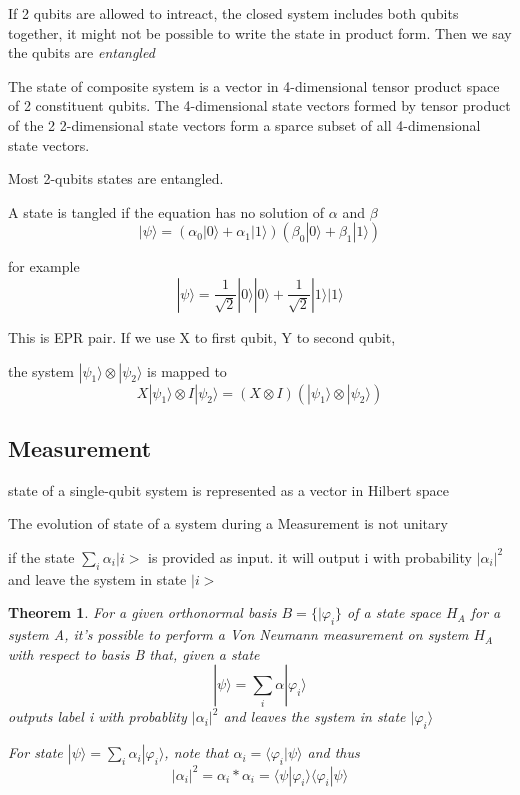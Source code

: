 \documentclass[10pt]{article}
\theoremstyle{break}
\newtheorem{thm}{Theorem}[subsection]
\begin{document}
If 2 qubits are allowed to intreact, the closed system includes both qubits together, 
it might not be possible to write the state in product form. 
Then we say the qubits are \emph{entangled}

The state of composite system is a vector in 4-dimensional tensor product space of 
2 constituent qubits. The 4-dimensional state vectors formed by tensor product of 
the 2 2-dimensional state vectors form a sparce subset of all 4-dimensional state vectors. 

Most 2-qubits states are entangled.

A state is tangled if the equation has no solution of $\alpha$ and $\beta$
$$|\psi\rangle=(\alpha_0|0\rangle+\alpha_1|1\rangle)(\beta_0|0\rangle+\beta_1|1\rangle)$$

for example $$|\psi\rangle=\frac{1}{\sqrt{2}}|0\rangle|0\rangle
+\frac{1}{\sqrt{2}}|1\rangle|1\rangle$$

This is EPR pair. If we use X to first qubit, Y to second qubit,

the system $|\psi_1\rangle\otimes|\psi_2\rangle$ is mapped to 
$$X|\psi_1\rangle\otimes I|\psi_2\rangle=(X\otimes I)(|\psi_1\rangle\otimes|\psi_2\rangle)$$

\subsection{Measurement}
state of a single-qubit system is represented as a vector in Hilbert space

The evolution of state of a system during a Measurement is not unitary 

if the state $\sum_i\alpha_i|i>$ is provided as input.
it will output i with probability $|\alpha_i|^2$ and leave the system in state $|i>$

\begin{thm}
    For a given orthonormal basis $B=\{|\varphi_i \}$ of a state space $H_A$
    for a system A, it's possible to perform a Von Neumann measurement on system $H_A$
    with respect to basis B that, given a state 
    $$|\psi\rangle = \sum_i\alpha|\varphi_i\rangle$$
    outputs label i with probablity $|\alpha_i|^2$ and leaves the system in state $|\varphi_i\rangle$

    For state $|\psi\rangle=\sum_i\alpha_i|\varphi_i\rangle$, note that 
    $\alpha_i=\langle\varphi_i|\psi\rangle$ and thus 
    $$|\alpha_i|^2=\alpha_i*\alpha_i=\langle\psi|\varphi_i\rangle\langle\varphi_i|\psi\rangle$$
\end{thm}
\end{document}
